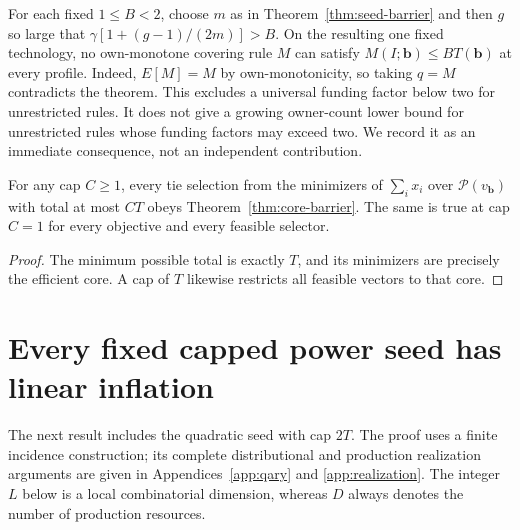 \begin{remark}
\label{rem:constant-two}
For each fixed $1\le B<2$, choose $m$ as in Theorem~\ref{thm:seed-barrier}
and then $g$ so large that $\gamma[1+(g-1)/(2m)]>B$.  On the resulting one
fixed technology, no own-monotone covering rule $M$ can satisfy
$M(I;\mathbf b)\le B T(\mathbf b)$ at every profile.  Indeed,
$E[M]=M$ by own-monotonicity, so taking $q=M$ contradicts the theorem.
This excludes a universal funding factor below two for unrestricted rules.
It does not give a growing owner-count lower bound for unrestricted rules
whose funding factors may exceed two.  We record it as an immediate
consequence, not an independent contribution.
\end{remark}

\begin{corollary}
\label{cor:r-one}
For any cap $C\ge1$, every tie selection from the minimizers of
$\sum_i x_i$ over $\mathcal P(v_{\mathbf b})$ with total at most $CT$
obeys Theorem~\ref{thm:core-barrier}.  The same is true at cap $C=1$
for every objective and every feasible selector.
\end{corollary}
\begin{proof}
The minimum possible total is exactly $T$, and its minimizers are precisely
the efficient core.  A cap of $T$ likewise restricts all feasible vectors
to that core.
\end{proof}

\section{Every fixed capped power seed has linear inflation}
\label{sec:fixed-caps}

The next result includes the quadratic seed with cap $2T$.  The proof uses
a finite incidence construction; its complete distributional and production
realization arguments are given in Appendices~\ref{app:qary} and
\ref{app:realization}.  The integer $L$ below is a local combinatorial
dimension, whereas $D$ always denotes the number of production resources.

